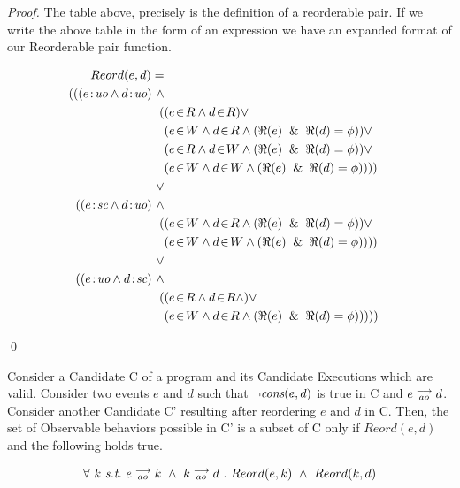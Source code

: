 \begin{proof}
        The table above, precisely is the definition of a reorderable pair. If we write the above table in the form of an expression we have an expanded format of our Reorderable pair function. 

        \begin{align*}
            Reord(e,d) = \\
            (
            ((\et{e}{uo} \wedge \et{d}{uo}) \ \wedge \\ 
                \quad ( 
                        &(\event{e}{R} \wedge \event{d}{R}) \vee \\ 
                        &(\event{e}{W} \wedge \event{d}{R} \wedge (\Re(e) \And \Re(d) = \phi)) \vee \\
                        &(\event{e}{R} \wedge \event{d}{W} \wedge (\Re(e) \And \Re(d) = \phi)) \vee \\
                        &(\event{e}{W} \wedge \event{d}{W} \wedge (\Re(e) \And \Re(d) = \phi)) 
                    )
            ) \\ \vee \\
            ((\et{e}{sc} \wedge \et{d}{uo}) \ \wedge \\
                \quad (
                        & (\event{e}{W} \wedge \event{d}{R} \wedge (\Re(e) \And \Re(d) = \phi)) \vee \\
                        & (\event{e}{W} \wedge \event{d}{W} \wedge (\Re(e) \And \Re(d) = \phi)) 
                    )
            ) \\ \vee \\
            ((\et{e}{uo} \wedge \et{d}{sc}) \ \wedge \\
                \quad (
                        & (\event{e}{R} \wedge \event{d}{R} \wedge) \vee \\
                        & (\event{e}{W} \wedge \event{d}{R} \wedge (\Re(e) \And \Re(d) = \phi)) 
                    )
            )
            )
        \end{align*}
        
        \qed  
\end{proof}

\begin{corollary}
    Consider a Candidate C of a program and its Candidate Executions which are valid. Consider two events $e$ and $d$ such that $\neg \textit{cons}(e,d)$ is true in C and $e\stackrel{\longrightarrow}{_{ao}}d$. Consider another Candidate C' resulting after reordering $e$ and $d$ in C. Then, the set of Observable behaviors possible in C' is a subset of C only if $Reord(e,d)$ and the following holds true.
    
    \[
        \forall \ k \ \textit{s.t.} \ 
        \reln{e}{ao}{k} \ \wedge \ \reln{k}{ao}{d} \ . \ 
        Reord(e,k) \ \wedge \ Reord(k,d)
    \]
    
\end{corollary}
    
